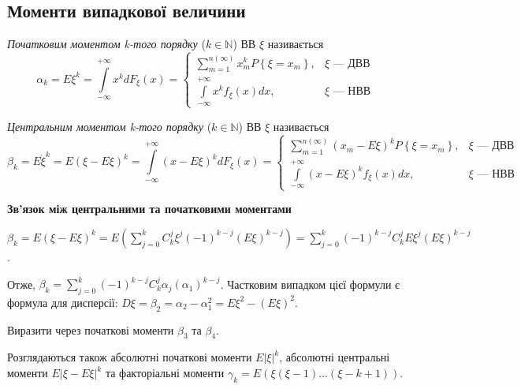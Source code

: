 \subsection{Моменти випадкової величини}
\begin{definition}
    \emph{Початковим моментом k-того порядку} ($k \in \mathbb{N}$) ВВ $\xi$ називається
    \begin{equation}\label{eq:e_alpha_k}
        \alpha_k = E\xi^k = \int\limits_{-\infty}^{+\infty} x^k dF_\xi(x) = \begin{cases}
            \sum\limits_{m=1}^{n(\infty)} x_m^k P\left\{\xi = x_m\right\}, & \xi \text{ --- ДВВ} \\
            \int\limits_{-\infty}^{+\infty} x^k f_\xi(x)dx, & \xi \text{ --- НВВ}
        \end{cases}
    \end{equation}
\end{definition}
\begin{definition}
    \emph{Центральним моментом k-того порядку} ($k \in \mathbb{N}$) ВВ $\xi$ називається
    \begin{equation}\label{eq:d_beta_k}
        \beta_k = E\mathring{\xi}^k = E\left(\xi-E\xi\right)^k = \int\limits_{-\infty}^{+\infty} \left(x-E\xi\right)^k dF_\xi(x) = \begin{cases}
            \sum\limits_{m=1}^{n(\infty)} \left(x_m-E\xi\right)^k P\left\{\xi = x_m\right\}, & \xi \text{ --- ДВВ} \\
            \int\limits_{-\infty}^{+\infty} \left(x-E\xi\right)^k f_\xi(x)dx, & \xi \text{ --- НВВ}
        \end{cases}
    \end{equation}
\end{definition}

\noindent \textbf{Зв'язок між центральними та початковими моментами}

$\beta_k = E\left(\xi-E\xi\right)^k = E\left( \sum\limits_{j=0}^k C_k^j \xi^j (-1)^{k-j} (E\xi)^{k-j}\right) =
\sum\limits_{j=0}^k (-1)^{k-j} C_k^j E\xi^j (E\xi)^{k-j}$.

\noindent Отже, $\beta_k = \sum\limits_{j=0}^k (-1)^{k-j} C_k^j \alpha_j (\alpha_1)^{k-j}$.
Частковим випадком цієї формули є формула для дисперсії: $D\xi = \beta_2 = \alpha_2 - \alpha_1^2 = E\xi^2 - (E\xi)^2$.
\begin{exercise}
    Виразити через початкові моменти $\beta_3$ та $\beta_4$.
\end{exercise}
Розглядаються також абсолютні початкові моменти $E\vert \xi \vert ^k$, абсолютні центральні моменти $E\vert \xi - E\xi \vert ^k$
та факторіальні моменти $\gamma_k = E\left( \xi (\xi - 1) ... (\xi - k + 1)\right)$.


